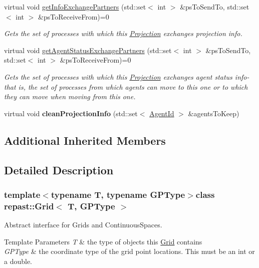 \begin{DoxyCompactItemize}
virtual void \hyperlink{classrepast_1_1_grid_a57b4449e602392119eb4db3e0011de05}{get\-Info\-Exchange\-Partners} (std\-::set$<$ int $>$ \&ps\-To\-Send\-To, std\-::set$<$ int $>$ \&ps\-To\-Receive\-From)=0
\begin{DoxyCompactList}\small\item\em Gets the set of processes with which this \hyperlink{classrepast_1_1_projection}{Projection} exchanges projection info. \end{DoxyCompactList}\item 
virtual void \hyperlink{classrepast_1_1_grid_a748354698308fe0d0c0fe33a657109d1}{get\-Agent\-Status\-Exchange\-Partners} (std\-::set$<$ int $>$ \&ps\-To\-Send\-To, std\-::set$<$ int $>$ \&ps\-To\-Receive\-From)=0
\begin{DoxyCompactList}\small\item\em Gets the set of processes with which this \hyperlink{classrepast_1_1_projection}{Projection} exchanges agent status info-\/ that is, the set of processes from which agents can move to this one or to which they can move when moving from this one. \end{DoxyCompactList}\item 
\hypertarget{classrepast_1_1_grid_ae4b6d41862836606e0393df7558e4d20}{virtual void {\bfseries clean\-Projection\-Info} (std\-::set$<$ \hyperlink{classrepast_1_1_agent_id}{Agent\-Id} $>$ \&agents\-To\-Keep)}\label{classrepast_1_1_grid_ae4b6d41862836606e0393df7558e4d20}

\end{DoxyCompactItemize}
\subsection*{Additional Inherited Members}


\subsection{Detailed Description}
\subsubsection*{template$<$typename T, typename G\-P\-Type$>$class repast\-::\-Grid$<$ T, G\-P\-Type $>$}

Abstract interface for Grids and Continuous\-Spaces. 


\begin{DoxyTemplParams}{Template Parameters}
{\em T} & the type of objects this \hyperlink{classrepast_1_1_grid}{Grid} contains \\
\hline
{\em G\-P\-Type} & the coordinate type of the grid point locations. This must be an int or a double. \\
\hline
\end{DoxyTemplParams}


